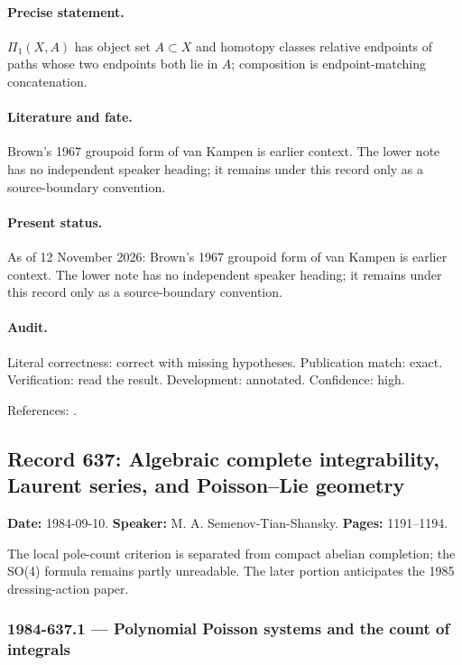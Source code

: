 \paragraph{Precise statement.} \(\Pi_1(X,A)\) has object set \(A\subset X\) and homotopy classes relative endpoints of paths whose two endpoints both lie in \(A\); composition is endpoint-matching concatenation.

\paragraph{Literature and fate.} Brown's 1967 groupoid form of van Kampen is earlier context. The lower note has no independent speaker heading; it remains under this record only as a source-boundary convention.

\paragraph{Present status.} As of 12 November 2026: Brown's 1967 groupoid form of van Kampen is earlier context. The lower note has no independent speaker heading; it remains under this record only as a source-boundary convention.

\paragraph{Audit.} Literal correctness: correct with missing hypotheses. Publication match: exact. Verification: read the result. Development: annotated. Confidence: high.

\noindent References: \citep{brown1967groupoids}.\par

\subsection{Record 637: Algebraic complete integrability, Laurent series, and Poisson--Lie geometry}

\label{talk:637}

\noindent\textbf{Date:} 1984-09-10. \textbf{Speaker:} M. A. Semenov-Tian-Shansky. \textbf{Pages:} 1191--1194.\par

The local pole-count criterion is separated from compact abelian completion; the SO(4) formula remains partly unreadable. The later portion anticipates the 1985 dressing-action paper.

\subsubsection{1984-637.1 --- Polynomial Poisson systems and the count of integrals}

